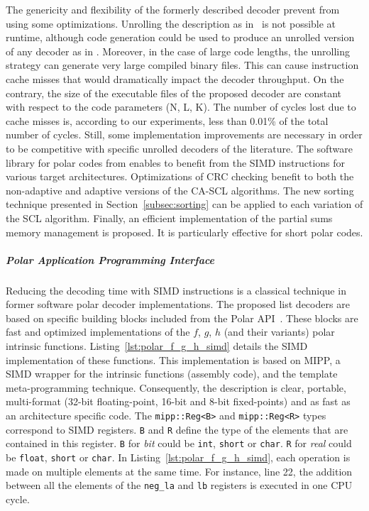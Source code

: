 The genericity and flexibility of the formerly described decoder prevent from
using some optimizations. Unrolling the description as in~\cite{Sarkis2016} is
not possible at runtime, although code generation could be used to produce an
unrolled version of any decoder as in \cite{Cassagne2015c}. Moreover, in the
case of large code lengths, the unrolling strategy can generate very large
compiled binary files. This can cause instruction cache misses that would
dramatically impact the decoder throughput. On the contrary, the size of the
executable files of the proposed decoder are constant with respect to the code
parameters (N, L, K). The number of cycles lost due to cache misses is,
according to our experiments, less than 0.01\% of the total number of cycles.
Still, some implementation improvements are necessary in order to be competitive
with specific unrolled decoders of the literature. The software library for
polar codes from \cite{Cassagne2015c,Cassagne2016b} enables to benefit from
the SIMD instructions for various target architectures. Optimizations of CRC
checking benefit to both the non-adaptive and adaptive versions of the CA-SCL
algorithms. The new sorting technique presented in Section~\ref{subsec:sorting}
can be applied to each variation of the SCL algorithm. Finally, an efficient
implementation of the partial sums memory management is proposed. It is
particularly effective for short polar codes.

\subparagraph{Polar Application Programming Interface}

Reducing the decoding time with SIMD instructions is a classical technique in
former software polar decoder implementations. The proposed list decoders are
based on specific building blocks included from the Polar
API~\cite{Cassagne2015c,Cassagne2016b}. These blocks are fast and optimized
implementations of the $f$, $g$, $h$ (and their variants) polar intrinsic
functions. Listing~\ref{lst:polar_f_g_h_simd} details the SIMD implementation of
these  functions. This implementation is based on MIPP, a SIMD wrapper for the
intrinsic functions (assembly code), and the template meta-programming
technique. Consequently, the description is clear, portable, multi-format
(32-bit floating-point, 16-bit and 8-bit fixed-points) and as fast as an
architecture specific code. The \texttt{mipp::Reg<B>} and \texttt{mipp::Reg<R>}
types correspond to SIMD registers. \texttt{B} and \texttt{R} define the type of
the elements that are contained in this register. \texttt{B} for \textit{bit}
could be \texttt{int}, \texttt{short} or \texttt{char}. \texttt{R} for
\textit{real} could be \texttt{float}, \texttt{short} or \texttt{char}. In
Listing~\ref{lst:polar_f_g_h_simd}, each operation is made on multiple elements
at the same  time. For instance, line 22, the addition between all the elements
of the \texttt{neg\_la} and \texttt{lb} registers is executed in one CPU cycle.

